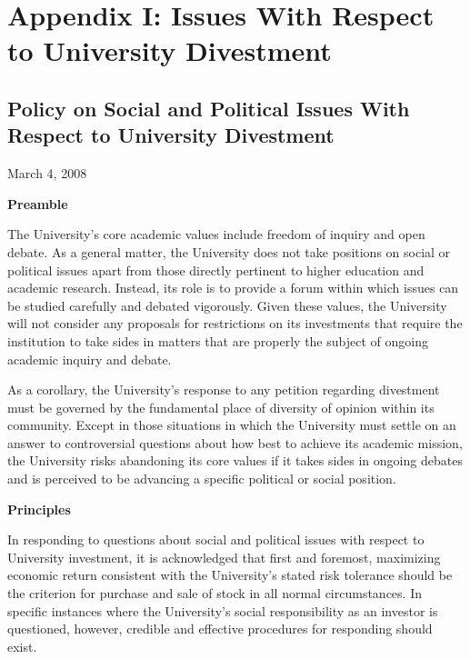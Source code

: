 		\section{Appendix I: Issues With Respect to University Divestment}
		
	\subsection{Policy on Social and Political Issues With Respect to University Divestment}


	
March 4, 2008



\textbf{Preamble}

 

The University's core academic values include freedom of inquiry and open debate. As a general matter, the University does not take positions on social or political issues apart from those directly pertinent to higher education and academic research.  Instead, its role is to provide a forum within which issues can be studied carefully and debated vigorously. Given these values, the University will not consider any proposals for restrictions on its investments that require the institution to take sides in matters that are properly the subject of ongoing academic inquiry and debate.

 

As a corollary, the University's response to any petition regarding divestment must be governed by the fundamental place of diversity of opinion within its community. Except in those situations in which the University must settle on an answer to controversial questions about how best to achieve its academic mission, the University risks abandoning its core values if it takes sides in ongoing debates and is perceived to be advancing a specific political or social position.



\textbf{Principles}

 

In responding to questions about social and political issues with respect to University investment, it is acknowledged that first and foremost, maximizing economic return consistent with the University’s stated risk tolerance should be the criterion for purchase and sale of stock in all normal circumstances. In specific instances where the University's social responsibility as an investor is questioned, however, credible and effective procedures for responding should exist.


